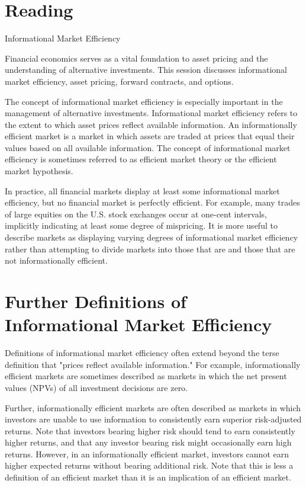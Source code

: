 \documentclass[11pt]{article}
\begin{document}
\section*{Reading}
Informational Market Efficiency

Financial economics serves as a vital foundation to asset pricing and the understanding of alternative investments. This session discusses informational market efficiency, asset pricing, forward contracts, and options.

The concept of informational market efficiency is especially important in the management of alternative investments. Informational market efficiency refers to the extent to which asset prices reflect available information. An informationally efficient market is a market in which assets are traded at prices that equal their values based on all available information. The concept of informational market efficiency is sometimes referred to as efficient market theory or the efficient market hypothesis.

In practice, all financial markets display at least some informational market efficiency, but no financial market is perfectly efficient. For example, many trades of large equities on the U.S. stock exchanges occur at one-cent intervals, implicitly indicating at least some degree of mispricing. It is more useful to describe markets as displaying varying degrees of informational market efficiency rather than attempting to divide markets into those that are and those that are not informationally efficient.

\section*{Further Definitions of Informational Market Efficiency}
Definitions of informational market efficiency often extend beyond the terse definition that "prices reflect available information." For example, informationally efficient markets are sometimes described as markets in which the net present values (NPVs) of all investment decisions are zero.

Further, informationally efficient markets are often described as markets in which investors are unable to use information to consistently earn superior risk-adjusted returns. Note that investors bearing higher risk should tend to earn consistently higher returns, and that any investor bearing risk might occasionally earn high returns. However, in an informationally efficient market, investors cannot earn higher expected returns without bearing additional risk. Note that this is less a definition of an efficient market than it is an implication of an efficient market.
\end{document}

